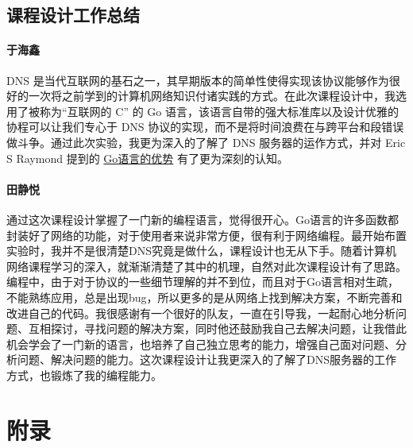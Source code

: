 \documentclass[blue,normal,cn]{elegantnote}
\begin{document}
\subsection{课程设计工作总结}
\paragraph{于海鑫} DNS 是当代互联网的基石之一，其早期版本的简单性使得实现该协议能够作为很好的一次将之前学到的计算机网络知识付诸实践的方式。在此次课程设计中，我选用了被称为``互联网的 C'' 的 Go 语言，该语言自带的强大标准库以及设计优雅的协程可以让我们专心于 DNS 协议的实现，而不是将时间浪费在与跨平台和段错误做斗争。通过此次实验，我更为深入的了解了 DNS 服务器的运作方式，并对 Eric S Raymond  提到的 \href{https://linux.cn/article-9503-1.html}{Go语言的优势} 有了更为深刻的认知。

\paragraph{田静悦} 通过这次课程设计掌握了一门新的编程语言，觉得很开心。Go语言的许多函数都封装好了网络的功能，对于使用者来说非常方便，很有利于网络编程。最开始布置实验时，我并不是很清楚DNS究竟是做什么，课程设计也无从下手。随着计算机网络课程学习的深入，就渐渐清楚了其中的机理，自然对此次课程设计有了思路。编程中，由于对于协议的一些细节理解的并不到位，而且对于Go语言相对生疏，不能熟练应用，总是出现bug，所以更多的是从网络上找到解决方案，不断完善和改进自己的代码。我很感谢有一个很好的队友，一直在引导我，一起耐心地分析问题、互相探讨，寻找问题的解决方案，同时他还鼓励我自己去解决问题，让我借此机会学会了一门新的语言，也培养了自己独立思考的能力，增强自己面对问题、分析问题、解决问题的能力。这次课程设计让我更深入的了解了DNS服务器的工作方式，也锻炼了我的编程能力。

\appendix
\section*{附录}
\end{document}

